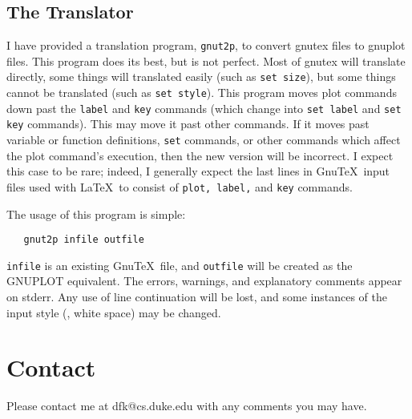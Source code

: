 \subsection{The Translator}
I have provided a translation program, {\tt gnut2p}, to convert gnutex
files to gnuplot files.  This program does its best, but is not
perfect. Most of gnutex will translate directly, some things will
translated easily (such as {\tt set size}), but some things cannot be
translated (such as {\tt set style}).  This program moves plot
commands down past the {\tt label} and {\tt key} commands (which
change into {\tt set label} and {\tt set key} commands). This may move
it past other commands. If it moves past variable or function
definitions, {\tt set} commands, or other commands which affect the
plot command's execution, then the new version will be incorrect. I
expect this case to be rare; indeed, I generally expect the last lines
in Gnu\TeX\ input files used with \LaTeX\ to consist of {\tt plot,
label,} and {\tt key} commands.

The usage of this program is simple: 
\begin{verbatim}
   gnut2p infile outfile
\end{verbatim}
{\tt infile} is an existing Gnu\TeX\ file, and {\tt outfile} will be
created as the GNUPLOT equivalent. The errors, warnings, and
explanatory comments appear on stderr. Any use of line continuation
will be lost, and some instances of the input style (\eg, white space)
may be changed.

\section{Contact}
Please contact me at dfk@cs.duke.edu with any comments you may have.



